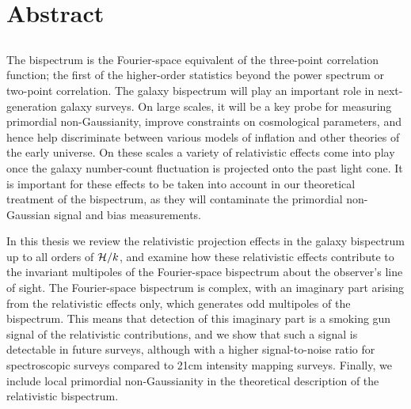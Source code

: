\chapter*{Abstract}
\label{ch:abstract}
\section*{}
\singlespacing

The bispectrum is the Fourier-space equivalent of the three-point correlation function; the first of the higher-order statistics beyond the power spectrum or two-point correlation. 
The galaxy bispectrum will play an important role in next-generation galaxy surveys. On large scales, it will be a key probe for measuring primordial non-Gaussianity, improve constraints on cosmological parameters, and hence help discriminate between various models of inflation and other theories of the early universe. On these scales a variety of relativistic effects come into play once the galaxy number-count fluctuation is projected onto the past light cone. It is important for these effects to be taken into account in our theoretical treatment of the bispectrum, as they will contaminate the primordial non-Gaussian signal and bias measurements. 

In this thesis we review the relativistic projection effects in the galaxy bispectrum up to all orders of $\mathcal{H}/k$, and examine how these relativistic effects contribute to the invariant multipoles of the Fourier-space bispectrum about the observer's line of sight. The Fourier-space bispectrum is complex, with an imaginary part arising from the relativistic effects only, which generates odd multipoles of the bispectrum. This means that detection of this imaginary part is a smoking gun signal of the relativistic contributions, and we show that such a signal is detectable in future surveys, although with a higher signal-to-noise ratio for spectroscopic surveys compared to 21cm intensity mapping surveys. Finally, we include local primordial non-Gaussianity in the theoretical description of the relativistic bispectrum. 